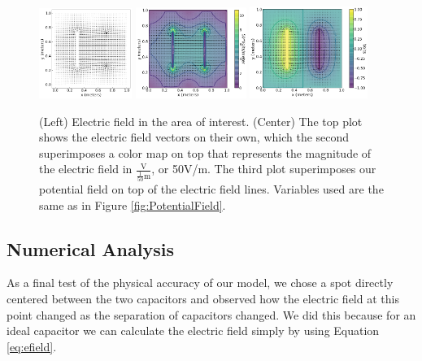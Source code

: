\documentclass{report}
\begin{document}
            \begin{figure}[h]
                \centering
                \includegraphics[width=0.27\textwidth]{images/ElectricField.png}
                \includegraphics[width=0.32\textwidth]{images/ElectricFieldMagnitude.png}
                \includegraphics[width=0.34\textwidth]{images/ElectricFieldWithPotential.png}
                \caption{(Left) Electric field in the area of interest. (Center) The top plot shows the electric field vectors on their own, which the second superimposes a color map on top that represents the magnitude of the electric field in $\frac{\text{V}}{\frac{1}{50}\text{m}}$, or 50V/m. The third plot superimposes our potential field on top of the electric field lines. Variables used are the same as in Figure \ref{fig:PotentialField}.}
                \label{fig:ElectricField}
            \end{figure}
            
        \subsection{Numerical Analysis}

            As a final test of the physical accuracy of our model, we chose a spot directly centered between the two capacitors and observed how the electric field at this point changed as the separation of capacitors changed. We did this because for an ideal capacitor we can calculate the electric field simply by using Equation \ref{eq:efield}.
            
\end{document}
